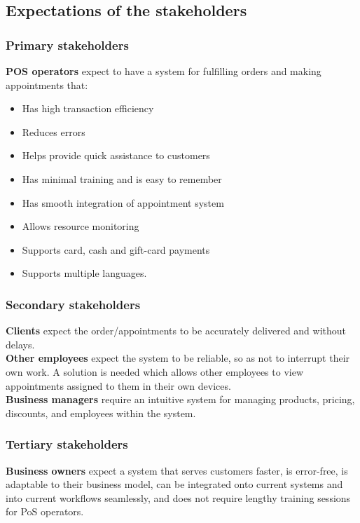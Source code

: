 \documentclass{article}
\begin{document}
\subsection{Expectations of the stakeholders}
\subsubsection{Primary stakeholders}
\textbf{POS operators} expect to have a system for fulfilling orders and making appointments that:
\begin{itemize}
    \item Has high transaction efficiency
    \item Reduces errors
    \item Helps provide quick assistance to customers
    \item Has minimal training and is easy to remember
    \item Has smooth integration of appointment system
    \item Allows resource monitoring
    \item Supports card, cash and gift-card payments
    \item Supports multiple languages.
\end{itemize}


\subsubsection{Secondary stakeholders}

\textbf{Clients} expect the order/appointments to be accurately delivered and without delays. 
\textbf{\\ Other employees} expect the system to be reliable, so as not to interrupt their own work. A solution is needed which allows other employees to view appointments assigned to them in their own devices.
\textbf{\\ Business managers} require an intuitive system for managing products, pricing, discounts, and employees within the system.

\subsubsection{Tertiary stakeholders}

\textbf{Business owners} expect a system that serves customers faster, is error-free, is adaptable to their business model, can be integrated onto current systems and into current workflows seamlessly, and does not require lengthy training sessions for PoS operators.
\newpage
\end{document}
